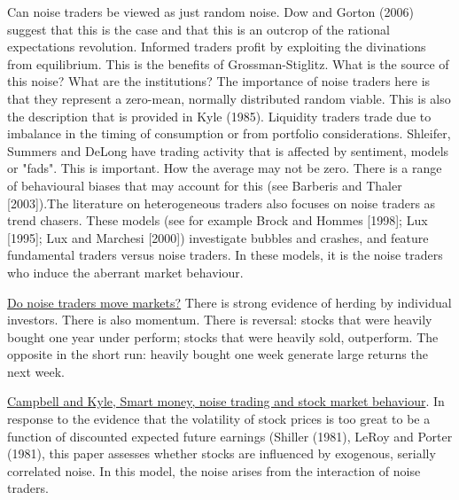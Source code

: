 \documentclass[12pt, a4paper, oneside]{article} %
\begin{document}
Can noise traders be viewed as just random noise.  Dow and Gorton (2006) suggest that this is the case and that this is an outcrop of the rational expectations revolution. Informed traders profit by exploiting the divinations from equilibrium. This is the benefits of Grossman-Stiglitz. What is the source of this noise?  What are the institutions? The importance of noise traders here is that they represent a zero-mean, normally distributed random viable.  This is also the description that is provided in Kyle (1985).  Liquidity traders trade due to imbalance in the timing of consumption or from portfolio considerations. Shleifer, Summers and DeLong have trading activity that is affected by sentiment, models or "fads".  This is important.  How the average may not be zero. There is a range of behavioural biases that may account for this (see Barberis and Thaler [2003]).The literature on heterogeneous traders also focuses on noise traders as trend chasers.  These models (see for example Brock and Hommes [1998]; Lux [1995]; Lux and Marchesi [2000]) investigate bubbles and crashes, and feature fundamental traders versus noise traders. In these models, it is the noise traders who 
induce the aberrant market behaviour.  

\href{http://papers.ssrn.com.ezproxy.liv.ac.uk/sol3/papers.cfm?abstract_id=869827}{Do noise traders move markets?}  There is strong evidence of herding by individual investors. There is also momentum. There is reversal:  stocks that were heavily bought one year under perform; stocks that were heavily sold, outperform. The opposite in the short run:  heavily bought one week generate large returns the next week. 

\href{http://restud.oxfordjournals.org.ezproxy.liv.ac.uk/content/60/1/1.full.pdf+html}{Campbell and Kyle, Smart money, noise trading and stock market behaviour}. In response to the evidence that the volatility of stock prices is too great to be a function of discounted expected future earnings (Shiller (1981),  LeRoy and Porter (1981), this paper assesses whether stocks are influenced by exogenous, serially correlated noise. In this model, the noise arises from the interaction of noise traders. 
\end{document}
